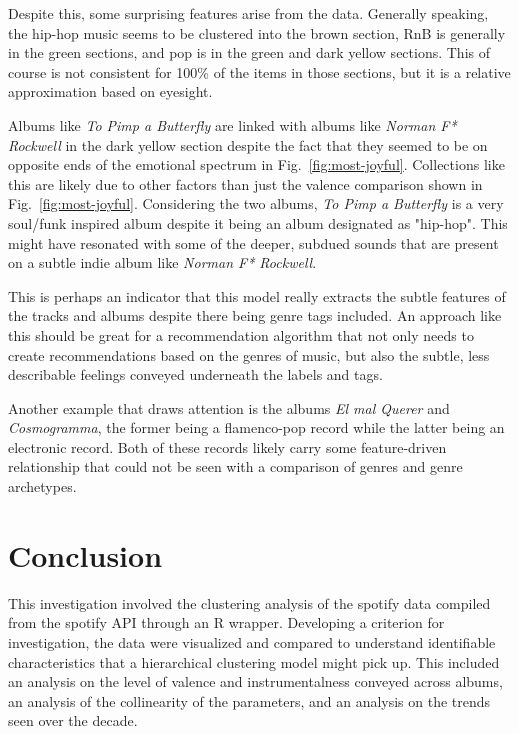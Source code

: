 \documentclass[conference]{IEEEtran}
\begin{document}
Despite this, some surprising features arise from the data. Generally speaking, the hip-hop music seems to be clustered into the brown section, RnB is generally in the green sections, and pop is in the green and dark yellow sections. This of course is not consistent for 100\% of the items in those sections, but it is a relative approximation based on eyesight. 

Albums like \textit{To Pimp a Butterfly} are linked with albums like \textit{Norman F* Rockwell} in the dark yellow section despite the fact that they seemed to be on opposite ends of the emotional spectrum in Fig.~\ref{fig:most-joyful}. Collections like this are likely due to other factors than just the valence comparison shown in Fig.~\ref{fig:most-joyful}. Considering the two albums, \textit{To Pimp a Butterfly} is a very soul/funk inspired album despite it being an album designated as "hip-hop". This might have resonated with some of the deeper, subdued sounds that are present on a subtle indie album like \textit{Norman F* Rockwell}. 

This is perhaps an indicator that this model really extracts the subtle features of the tracks and albums despite there being genre tags included. An approach like this should be great for a recommendation algorithm that not only needs to create recommendations based on the genres of music, but also the subtle, less describable feelings conveyed underneath the labels and tags. 

Another example that draws attention is the albums \textit{El mal Querer} and \textit{Cosmogramma}, the former being a flamenco-pop record while the latter being an electronic record. Both of these records likely carry some feature-driven relationship that could not be seen with a comparison of genres and genre archetypes. 

\section{Conclusion}

This investigation involved the clustering analysis of the spotify data compiled from the spotify API through an R wrapper. Developing a criterion for investigation, the data were visualized and compared to understand identifiable characteristics that a hierarchical clustering model might pick up. This included an analysis on the level of valence and instrumentalness conveyed across albums, an analysis of the collinearity of the parameters, and an analysis on the trends seen over the decade. 
\end{document}
